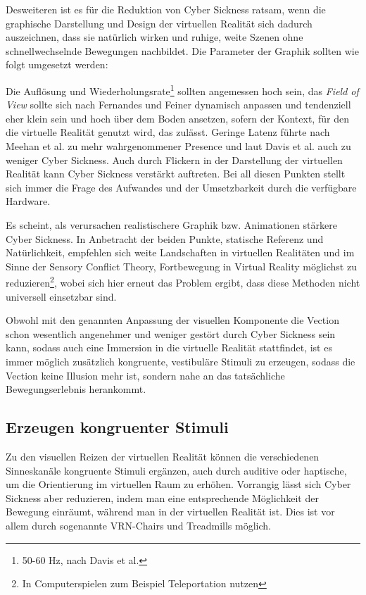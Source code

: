 Desweiteren ist es f\"ur die Reduktion von Cyber Sickness ratsam, wenn die graphische Darstellung und Design der virtuellen Realit\"at sich dadurch auszeichnen, dass sie nat\"urlich wirken und ruhige, weite Szenen ohne schnellwechselnde Bewegungen nachbildet. Die Parameter der Graphik sollten wie folgt umgesetzt werden:

Die Aufl\"osung und Wiederholungsrate\footnote{50-60 Hz, nach Davis et al.\cite{Davis:2014:Factors}} sollten angemessen hoch sein\cite{kirollos:2019:refresh}, das \textit{Field of View} sollte sich nach Fernandes und Feiner\cite{Fenandes:2016:FOV} dynamisch anpassen und tendenziell eher klein sein und hoch \"uber dem Boden ansetzen, sofern der Kontext, f\"ur den die virtuelle Realit\"at genutzt wird, das zul\"asst. Geringe Latenz f\"uhrte nach Meehan et al.\cite{Meehan:2003:latency} zu mehr wahrgenommener Presence und laut Davis et al.\cite{Davis:2014:Factors} auch zu weniger Cyber Sickness. Auch durch Flickern in der Darstellung der virtuellen Realit\"at kann Cyber Sickness verst\"arkt auftreten.
Bei all diesen Punkten stellt sich immer die Frage des Aufwandes und der Umsetzbarkeit durch die verf\"ugbare Hardware.

Es scheint, als verursachen realistischere Graphik bzw. Animationen st\"arkere Cyber Sickness\cite{Pouke:2018:Realism}.
In Anbetracht der beiden Punkte, statische Referenz und Nat\"urlichkeit, empfehlen sich weite Landschaften in virtuellen Realit\"aten und im Sinne der Sensory Conflict Theory, Fortbewegung in Virtual Reality m\"oglichst zu reduzieren\footnote{In Computerspielen zum Beispiel Teleportation nutzen}, wobei sich hier erneut das Problem ergibt, dass diese Methoden nicht universell einsetzbar sind.

Obwohl mit den genannten Anpassung der visuellen Komponente die Vection schon wesentlich angenehmer und weniger gest\"ort durch Cyber Sickness sein kann, sodass auch eine Immersion in die virtuelle Realit\"at stattfindet, ist es immer m\"oglich zus\"atzlich kongruente, vestibul\"are Stimuli zu erzeugen, sodass die Vection keine Illusion mehr ist, sondern nahe an das tats\"achliche Bewegungserlebnis herankommt.

\subsection{Erzeugen kongruenter Stimuli}\label{Vestibular}

Zu den visuellen Reizen der virtuellen Realit\"at k\"onnen die verschiedenen Sinneskan\"ale kongruente Stimuli erg\"anzen, auch durch auditive oder haptische, um die Orientierung im virtuellen Raum zu erh\"ohen. Vorrangig l\"asst sich Cyber Sickness aber reduzieren, indem man eine entsprechende M\"oglichkeit der Bewegung einr\"aumt, w\"ahrend man in der virtuellen Realit\"at ist. Dies ist vor allem durch sogenannte VRN-Chairs und Treadmills m\"oglich.

